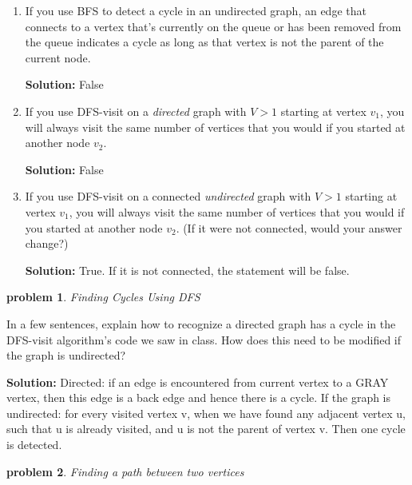 \documentclass[10pt]{article}
\newcommand{\solution}[1]{\color{blue}\hfill\break\noindent\textbf{Solution:} #1\color{black}}
\newtheorem{problem}{\sc\color{cit}problem}
\begin{document}
\begin{enumerate}
\renewcommand{\theenumi}{\Alph{enumi}}

    \item If you use BFS to detect a cycle in an undirected graph, an edge that connects to a vertex that's currently on the queue or has been removed from the queue indicates a cycle as long as that vertex is not the parent of the current node.

    \solution{    
    False
    }
    
    \item If you use DFS-visit on a \textit{directed} graph with $V>1$ starting at vertex $v_1$, you will always visit the same number of vertices that you would if you started at another node $v_2$.
    
    \solution{
    False
    }
    
    \item If you use DFS-visit on a connected \textit{undirected} graph with $V>1$ starting at vertex $v_1$, you will always visit the same number of vertices that you would if you started at another node $v_2$. (If it were not connected, would your answer change?)
    
    \solution{
    True. If it is not connected, the statement will be false.
    }

\end{enumerate}


\begin{problem} Finding Cycles Using DFS  \end{problem}

In a few sentences, explain how to recognize a directed graph has a cycle in the DFS-visit algorithm's code we saw in class. How does this need to be modified if the graph is undirected?

\solution{
    Directed: if an edge is encountered from current vertex to a GRAY vertex, then this edge is a back edge and hence there is a cycle. If the graph is undirected: for every visited vertex v, when we have found any adjacent vertex u, such that u is already visited, and u is not the parent of vertex v. Then one cycle is detected.
}


\begin{problem} Finding a path between two vertices \end{problem}
\end{document}
